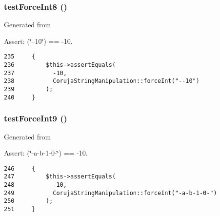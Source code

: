 \hypertarget{class_coruja_string_manipulation_test_e6516654233581dabace64bd33858c44}{
\subsubsection[{testForceInt8}]{\setlength{\rightskip}{0pt plus 5cm}testForceInt8 ()}}
\label{class_coruja_string_manipulation_test_e6516654233581dabace64bd33858c44}


Generated from \begin{Desc}
\item[Assert:](\char`\"{}--10\char`\"{}) == -10. \end{Desc}


\begin{Code}\begin{verbatim}235     {
236         $this->assertEquals(
237           -10,
238           CorujaStringManipulation::forceInt("--10")
239         );
240     }
\end{verbatim}
\end{Code}


\hypertarget{class_coruja_string_manipulation_test_3912276169508fc05c0345e2a533c79d}{
\subsubsection[{testForceInt9}]{\setlength{\rightskip}{0pt plus 5cm}testForceInt9 ()}}
\label{class_coruja_string_manipulation_test_3912276169508fc05c0345e2a533c79d}


Generated from \begin{Desc}
\item[Assert:](\char`\"{}-a-b-1-0-\char`\"{}) == -10. \end{Desc}


\begin{Code}\begin{verbatim}246     {
247         $this->assertEquals(
248           -10,
249           CorujaStringManipulation::forceInt("-a-b-1-0-")
250         );
251     }
\end{verbatim}
\end{Code}


